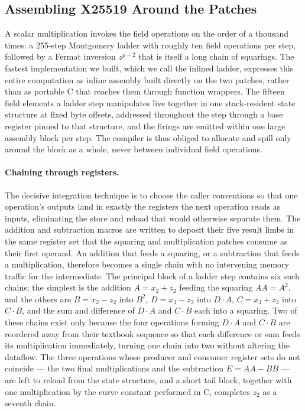 \subsection{Assembling X25519 Around the Patches}
\label{sec:c25519-assemble}

A scalar multiplication invokes the field operations on the order of a thousand
times: a 255-step Montgomery ladder with roughly ten field operations per step,
followed by a Fermat inversion $z^{p-2}$ that is itself a long chain of squarings.
The fastest implementation we built, which we call the inlined ladder, expresses
this entire computation as inline assembly built directly on the two patches,
rather than as portable C that reaches them through function wrappers. The fifteen
field elements a ladder step manipulates live together in one stack-resident
state structure at fixed byte offsets, addressed throughout the step through a
base register pinned to that structure, and the firings are emitted within one
large assembly block per step. The compiler is thus obliged to allocate and spill
only around the block as a whole, never between individual field operations.

\paragraph{Chaining through registers.}
The decisive integration technique is to choose the caller conventions so that one
operation's outputs land in exactly the registers the next operation reads as
inputs, eliminating the store and reload that would otherwise separate them. The
addition and subtraction macros are written to deposit their five result limbs in
the same register set that the squaring and multiplication patches consume as
their first operand. An addition that feeds a squaring, or a subtraction that feeds
a multiplication, therefore becomes a single chain with no intervening memory
traffic for the intermediate. The principal block of a ladder step contains six
such chains; the simplest is the addition $A=x_2+z_2$ feeding the squaring
$AA=A^2$, and the others are $B=x_2-z_2$ into $B^2$, $D=x_3-z_3$ into $D\!\cdot\!A$,
$C=x_3+z_3$ into $C\!\cdot\!B$, and the sum and difference of $D\!\cdot\!A$ and
$C\!\cdot\!B$ each into a squaring. Two of these chains exist only because the four
operations forming $D\!\cdot\!A$ and $C\!\cdot\!B$ are reordered away from their
textbook sequence so that each difference or sum feeds its multiplication
immediately, turning one chain into two without altering the dataflow. The three
operations whose producer and consumer register sets do not coincide --- the two
final multiplications and the subtraction $E=AA-BB$ --- are left to reload from the
state structure, and a short tail block, together with one multiplication by the
curve constant performed in C, completes $z_2$ as a seventh chain.

